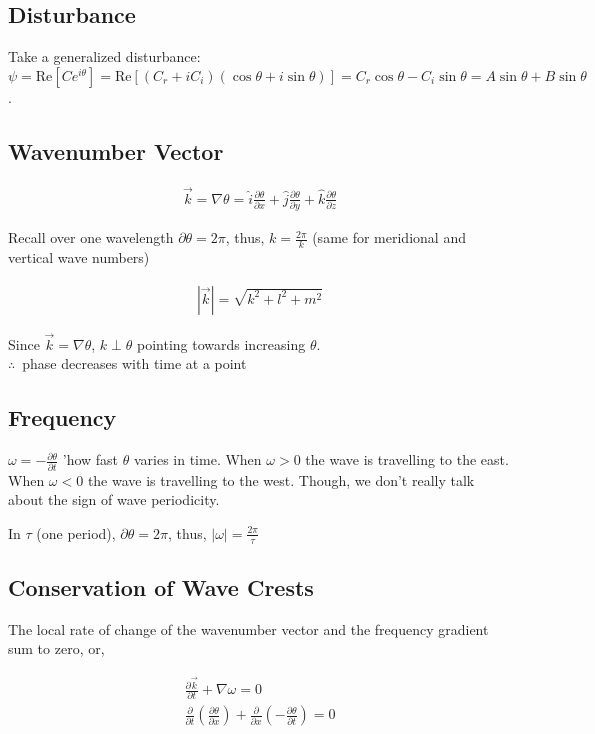 \documentclass[a4paper,12pt]{article}
\begin{document}
\subsection*{Disturbance}
Take a generalized disturbance: $\psi = \text{Re}\left[Ce^{i\theta}\right] = \text{Re}\left[(C_r + iC_i)(\cos{\theta}+ i\sin{\theta})\right] = C_r \cos{\theta}- C_i\sin{\theta} = A\sin{\theta}+B\sin{\theta}$.

\subsection*{Wavenumber Vector}

\begin{align}
\vec{k} = \nabla \theta = \hat{i}\frac{\partial \theta}{\partial x} + \hat{j}\frac{\partial \theta}{\partial y} + \hat{k} \frac{\partial \theta}{\partial z}
\end{align}

Recall over one wavelength $\partial \theta = 2\pi$, thus, $k = \frac{2\pi}{k}$ (same for meridional and vertical wave numbers)

\begin{align*}
|\vec{k}| = \sqrt{k^2 + l^2 + m^2}
\end{align*}

Since $\vec{k} = \nabla \theta$, $k \perp \theta$ pointing towards increasing $\theta$.\\

$\therefore \,$ phase decreases with time at a point

\subsection*{Frequency}
$\omega = -\frac{\partial \theta}{\partial t}$ 'how fast $\theta$ varies in time. When $\omega > 0$ the wave is travelling to the east. When $\omega < 0$ the wave is travelling to the west. Though, we don't really talk about the sign of wave periodicity.

In $\tau$ (one period), $\partial \theta  = 2\pi$, thus, $|\omega| = \frac{2\pi}{\tau}$

\subsection*{Conservation of Wave Crests}
The local rate of change of the wavenumber vector and the frequency gradient sum to zero, or,

\begin{align*}
\frac{\partial \vec{k}}{\partial t} + \nabla \omega = 0\\
\frac{\partial}{\partial t}(\frac{\partial \theta}{\partial x}) + \frac{\partial}{\partial x}(-\frac{\partial \theta}{\partial t}) = 0
\end{align*}
\end{document}
